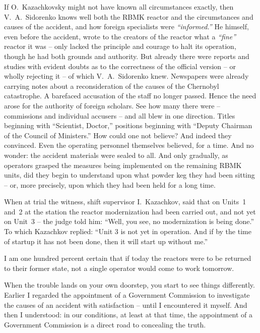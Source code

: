 \documentclass[openright]{bookest}
\begin{document}
If O.~Kazachkovsky might not have known all circumstances exactly, then V.~A.~Sidorenko knows well both the RBMK reactor and the circumstances and causes of the accident, and how foreign specialists were \textit{``informed.''} He himself, even before the accident, wrote to the creators of the reactor what a \textit{``fine''} reactor it was -- only lacked the principle and courage to halt its operation, though he had both grounds and authority. But already there were reports and studies with evident doubts as to the correctness of the official version -- or wholly rejecting it -- of which V.~A.~Sidorenko knew. Newspapers were already carrying notes about a reconsideration of the causes of the Chernobyl catastrophe. A barefaced accusation of the staff no longer passed. Hence the need arose for the authority of foreign scholars. See how many there were -- commissions and individual accusers -- and all blew in one direction. Titles beginning with ``Scientist, Doctor,'' positions beginning with ``Deputy Chairman of the Council of Ministers.'' How could one not believe? And indeed they convinced. Even the operating personnel themselves believed, for a time. And no wonder: the accident materials were sealed to all. And only gradually, as operators grasped the measures being implemented on the remaining RBMK units, did they begin to understand upon what powder keg they had been sitting -- or, more precisely, upon which they had been held for a long time.

When at trial the witness, shift supervisor I.~Kazachkov, said that on Units~1 and~2 at the station the reactor modernization had been carried out, and not yet on Unit~3 -- the judge told him: ``Well, you see, no modernization is being done.'' To which Kazachkov replied: ``Unit 3 is not yet in operation. And if by the time of startup it has not been done, then it will start up without me.''

I am one hundred percent certain that if today the reactors were to be returned to their former state, not a single operator would come to work tomorrow.

When the trouble lands on your own doorstep, you start to see things differently. Earlier I regarded the appointment of a Government Commission to investigate the causes of an accident with satisfaction -- until I encountered it myself. And then I understood: in our conditions, at least at that time, the appointment of a Government Commission is a direct road to concealing the truth.

\end{document}

